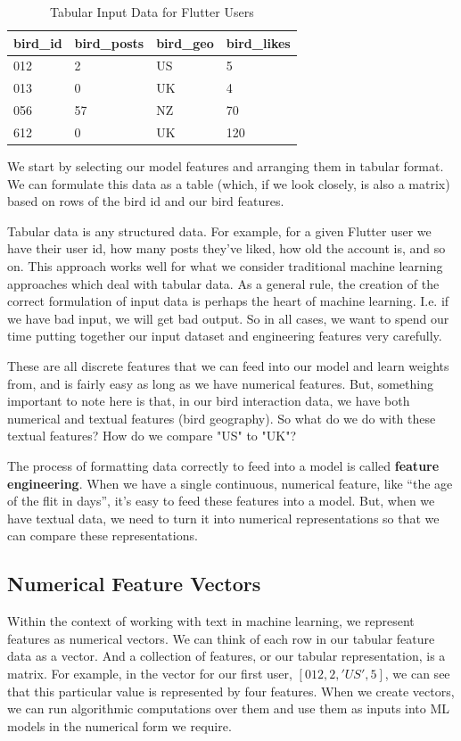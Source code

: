 \documentclass[11pt, table]{diazessay} %
\begin{document}
\begin{sloppypar}
\begin{table}[H]
  \centering
    \caption{Tabular Input Data for Flutter Users}
\begin{tabular}{|l|l|l|l|}
\hline
\rowcolor[HTML]{D5E7F7} 
bird\_id & bird\_posts & bird\_geo & bird\_likes \\ \hline
012      & 2           & US        & 5           \\ \hline
013      & 0           & UK        & 4           \\ \hline
056      & 57          & NZ        & 70          \\ \hline
612      & 0           & UK        & 120         \\ \hline
\end{tabular}
\end{table}

We start by selecting our model features and arranging them in tabular format.  We can formulate this data as a table (which, if we look closely, is also a matrix) based on rows of the bird id and our bird features.

Tabular data is any structured data. For example, for a given Flutter user we have their user id, how many posts they've liked, how old the account is, and so on. This approach works well for what we consider traditional machine learning approaches which deal with tabular data.  As a general rule, the creation of the correct formulation of input data is perhaps the heart of machine learning. I.e. if we have bad input, we will get bad output. So in all cases, we want to spend our time putting together our input dataset and engineering features very carefully. 

These are all discrete features that we can feed into our model and learn weights from, and is fairly easy as long as we have numerical features.  But, something important to note here is that, in our bird interaction data, we have both numerical and textual features (bird geography). So what do we do with these textual features? How do we compare "US" to "UK"? 

The process of formatting data correctly to feed into a model is called \textbf{feature engineering}. When we have a single continuous, numerical feature, like “the age of the flit in days”, it’s easy to feed these features into a model. But, when we have textual data, we need to turn it into numerical representations so that we can compare these representations.  

\subsection{Numerical Feature Vectors}
Within the context of working with text in machine learning, we represent features as numerical vectors. We can think of each row in our tabular feature data as a vector. And a collection of features, or our tabular representation, is a matrix. For example, in the vector for our first user, $[012, 2, 'US', 5]$, we can see that this particular value is represented by four features. When we create vectors, we can run algorithmic computations over them and use them as inputs into ML models in the numerical form we require. 


\end{sloppypar}
\end{document}
